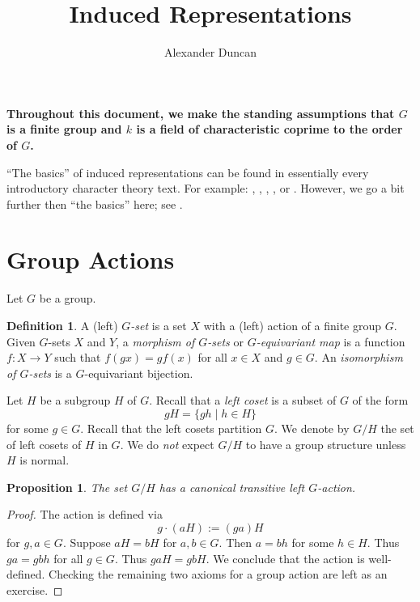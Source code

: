 \documentclass[12pt]{article}
\theoremstyle{plain}
\newtheorem{proposition}[theorem]{Proposition}
\theoremstyle{definition}
\newtheorem{definition}[theorem]{Definition}
\theoremstyle{remark}
\numberwithin{equation}{section}
\begin{document}
\title{Induced Representations}
\author{Alexander Duncan}

\maketitle

{\bf
Throughout this document, we make the standing assumptions that $G$
is a finite group and $k$ is a field of characteristic coprime to the
order of $G$.}

``The basics'' of induced representations can be found in essentially
every introductory character theory text.  For example:
\cite[\S{16}]{AlperinBell},
\cite[\S{5.8-5.11}]{Etingof},
\cite[\S{3.3}]{FultonHarris},
\cite[\S{XVIII.6--9}]{Lang}, or
\cite[\S{3.3}]{Serre}.
However, we go a bit further then ``the basics'' here;
see \cite[\S{7--10}]{Serre}.


\section{Group Actions}

Let $G$ be a group.

\begin{definition}
A (left) \emph{$G$-set} is a set $X$ with a (left) action of a finite
group $G$.  Given $G$-sets $X$ and $Y$, a \emph{morphism of $G$-sets}
or \emph{$G$-equivariant map} is a function $f : X \to Y$
such that $f(gx)=gf(x)$ for all $x \in X$ and $g \in G$.
An \emph{isomorphism of $G$-sets} is a $G$-equivariant bijection. 
\end{definition}

Let $H$ be a subgroup $H$ of $G$.  Recall that a \emph{left coset} is a
subset of $G$ of the form
\[
gH = \{ gh \mid h \in H \}
\]
for some $g \in G$.  Recall that the left cosets partition $G$.
We denote by $G/H$ the set of left cosets of $H$ in $G$.
We do \emph{not} expect $G/H$ to have a group structure unless $H$ is
normal.

\begin{proposition}
The set $G/H$ has a canonical transitive left $G$-action.
\end{proposition}

\begin{proof}
The action is defined via
\[
g \cdot (aH) := (ga)H
\]
for $g,a \in G$.
Suppose $aH=bH$ for $a,b \in G$.  Then $a=bh$ for some $h \in H$.
Thus $ga=gbh$ for all $g \in G$.  Thus $gaH=gbH$.
We conclude that the action is well-defined.
Checking the remaining two axioms for a group action are left as an exercise.
\end{proof}
\end{document}
